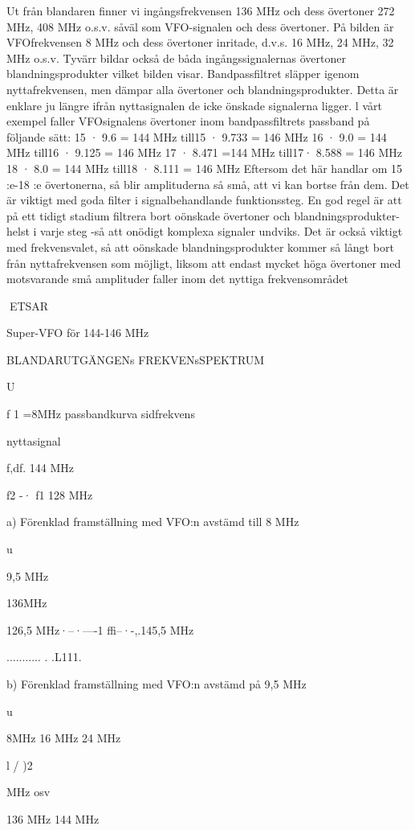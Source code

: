 Ut från blandaren finner vi ingångsfrekvensen 136 MHz och dess övertoner 272
MHz, 408 MHz o.s.v. såväl som VFO-signalen och dess övertoner. På bilden är VFOfrekvensen 8 MHz och dess övertoner inritade, d.v.s. 16 MHz, 24 MHz, 32 MHz o.s.v.
Tyvärr bildar också de båda ingångssignalernas övertoner blandningsprodukter vilket bilden visar.
Bandpassfiltret släpper igenom nyttafrekvensen, men dämpar alla övertoner och
blandningsprodukter. Detta är enklare ju
längre ifrån nyttasignalen de icke önskade
signalerna ligger. l vårt exempel faller VFOsignalens övertoner inom bandpassfiltrets
passband på följande sätt:
15 · 9.6 = 144 MHz till15 · 9.733 = 146 MHz
16 · 9.0 = 144 MHz till16 · 9.125 = 146 MHz
17 · 8.471 =144 MHz till17· 8.588 = 146 MHz
18 · 8.0 = 144 MHz till18 · 8.111 = 146 MHz
Eftersom det här handlar om 15 :e-18 :e
övertonerna, så blir amplituderna så små, att
vi kan bortse från dem.
Det är viktigt med goda filter i signalbehandlande funktionssteg. En god regel är att
på ett tidigt stadium filtrera bort oönskade
övertoner och blandningsprodukter-helst i
varje steg -så att onödigt komplexa signaler
undviks. Det är också viktigt med frekvensvalet, så att oönskade blandningsprodukter
kommer så långt bort från nyttafrekvensen
som möjligt, liksom att endast mycket höga
övertoner med motsvarande små amplituder faller inom det nyttiga frekvensområdet

ETSAR

Super-VFO för 144-146 MHz

BLANDARUTGÄNGENs FREKVENsSPEKTRUM

U

f 1 =8MHz
passbandkurva
sidfrekvens

nyttasignal

f,df.
144 MHz

f2 -· f1
128 MHz

a) Förenklad framställning med VFO:n avstämd till 8 MHz

u

9,5 MHz

136MHz

126,5 MHz·--·----1 ffi--·-,.145,5 MHz

........... . .L111.

b) Förenklad framställning med VFO:n avstämd på 9,5 MHz

u

8MHz
16 MHz
24 MHz

l / )2

MHz osv

136 MHz
144 MHz


